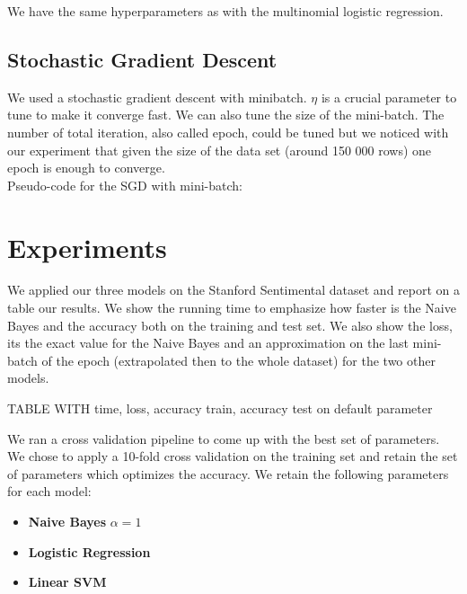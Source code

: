 \documentclass[11pt]{article}
\begin{document}
\noindent We have the same hyperparameters as with the multinomial logistic regression.

\subsection{Stochastic Gradient Descent}

We used a stochastic gradient descent with minibatch. $\eta$ is a crucial parameter to tune to make it converge fast. We can also tune the size of the mini-batch. The number of total iteration, also called epoch, could be tuned but we noticed with our experiment that given the size of the data set (around 150 000 rows) one epoch is enough to converge.\\


Pseudo-code for the SGD with mini-batch:

  \begin{algorithmic}[1]
    \EndFor{}
    \EndFor{}
    \State{\Return{$\theta$}}
  \end{algorithmic}


\section{Experiments}

We applied our three models on the Stanford Sentimental dataset and report on a table our results. We show the running time to emphasize how faster is the Naive Bayes and the accuracy both on the training and test set. We also show the loss, its the exact value for the Naive Bayes and an approximation on the last mini-batch of the epoch (extrapolated then to the whole dataset) for the two other models.

TABLE WITH time, loss, accuracy train, accuracy test on default parameter


\noindent We ran a cross validation pipeline to come up with the best set of parameters. We chose to apply a 10-fold cross validation on the training set and retain the set of parameters which optimizes the accuracy. We retain the following parameters for each model:
\begin{itemize}
	\item \textbf{Naive Bayes} $\alpha = 1$
	\item \textbf{Logistic Regression}
	\item \textbf{Linear SVM}
\end{itemize}
\end{document}
